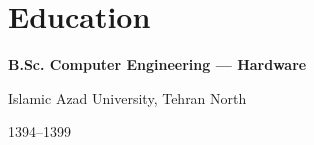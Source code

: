 \section{Education}

\textbf{B.Sc. Computer Engineering — Hardware}

Islamic Azad University, Tehran North

1394--1399
